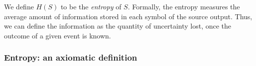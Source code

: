 \documentclass{subfiles}
\begin{document}
    We define \(H(S)\) to be the \emph{entropy} of \(S\). 
    Formally, the entropy measures the average amount of information stored 
        in each symbol of the source output.
        Thus, we can define the information as the quantity of uncertainty lost,
        once the outcome of a given event is known.

    \subsubsection{Entropy: an axiomatic definition}\label{Sec:1.1.1}
    
\end{document}
